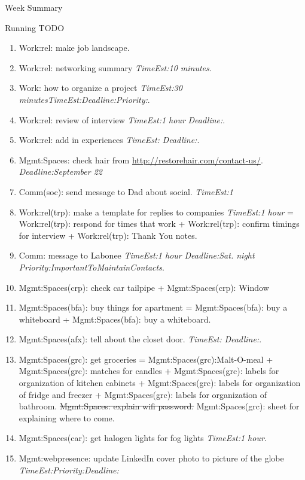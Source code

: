 \documentclass[serif, mathserif, final]{beamer}
\newcommand{\doneTaskNoItem}[1]{\sout{#1}}
\newcommand{\te}[1]{\textit{TimeEst:}\textit{#1}}
\newcommand{\dl}[1]{\textit{Deadline:}\textit{#1}}
\newcommand{\pr}[1]{\textit{Priority:}\textit{#1}}
\begin{document}
\begin{frame}
\begin{columns}
\begin{column}{0.5\linewidth}
\begin{block}{Week Summary}
\begin{block}{Running TODO}
\begin{enumerate}
      \item \tiny Work:rel: make job landscape.
      \item \tiny Work:rel: networking summary \te{10 minutes}.
      \item \tiny Work: how to organize a project \te{30
        minutes}\te{}\dl{}\pr{}. 
      \item \tiny Work:rel: review of interview \te{1 hour} \dl{}.
      \item \tiny Work:rel: add in experiences \te{} \dl{}. 

      \item \tiny Mgmt:Spaces: check hair from
        \url{http://restorehair.com/contact-us/}. \dl{September 22}

      \item \tiny Comm(soc): send message to Dad about social. \te{1} 

      \item \tiny Work:rel(trp): make a template for replies to
        companies \te{1 hour} = Work:rel(trp): respond for times that
        work + Work:rel(trp): confirm timings for interview +
        Work:rel(trp): Thank You notes. 

      \item \tiny Comm: message to Labonee \te{1 hour} \dl{Sat. night}
        \pr{ImportantToMaintainContacts}.
        
      \item \tiny Mgmt:Spaces(crp): check car tailpipe +
        Mgmt:Spaces(crp): Window 

      \item \tiny Mgmt:Spaces(bfa): buy things for apartment =
        Mgmt:Spaces(bfa): buy a whiteboard + Mgmt:Spaces(bfa): buy a
        whiteboard. 
      \item \tiny Mgmt:Spaces(afx): tell about the closet door. \te{}
        \dl{}.

      \item \tiny Mgmt:Spaces(grc): get groceries =
        Mgmt:Spaces(grc):Malt-O-meal + Mgmt:Spaces(grc): matches for
        candles + Mgmt:Spaces(grc): labels for organization of kitchen
        cabinets + Mgmt:Spaces(grc): labels for organization of fridge
        and freezer + Mgmt:Spaces(grc): labels for organization of bathroom. 
        \doneTaskNoItem{Mgmt:Spaces: explain wifi password.} 
        Mgmt:Spaces(grc): sheet for explaining where to come.
      \item \tiny  Mgmt:Spaces(car): get halogen lights for fog lights
        \te{1 hour}.
      \item \tiny Mgmt:webpresence: update LinkedIn cover photo to picture
        of the globe \te{}\pr{}\dl{} 
        \end{enumerate}
      \end{block}


\end{block}
\end{column}
\end{columns}
\end{frame}
\end{document}

